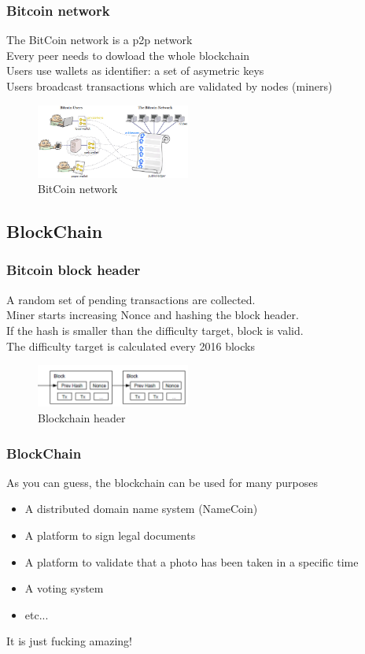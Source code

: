 \documentclass[usepdftitle=false,13pt]{beamer}
\begin{document}
\begin{frame}\frametitle{Bitcoin network}
The BitCoin network is a p2p network\\
Every peer needs to dowload the whole blockchain\\
Users use wallets as identifier: a set of asymetric keys\\
Users broadcast transactions which are validated by nodes (miners)\\
\begin{figure}[h!]
\begin{center}
\includegraphics[width=0.45\textwidth]{pic/bitcoin-network}
\caption{BitCoin network}
\label{fig:block}
\end{center}
\end{figure}
\end{frame}

\subsection{BlockChain}

\begin{frame}\frametitle{Bitcoin block header}
A random set of pending transactions are collected.\\
Miner starts increasing Nonce and hashing the block header.\\
If the hash is smaller than the difficulty target, block is valid.\\
The difficulty target is calculated every 2016 blocks\\
\begin{figure}[h!]
\begin{center}
\includegraphics[width=0.45\textwidth]{pic/block}
\caption{Blockchain header}
\label{fig:block}
\end{center}
\end{figure}
\end{frame}

\begin{frame}\frametitle{BlockChain}
	As you can guess, the blockchain can be used for many purposes
	\begin{itemize}
		\item A distributed domain name system (NameCoin)
		\item A platform to sign legal documents
		\item A platform to validate that a photo has been taken in a specific time
		\item A voting system
		\item etc...
	\end{itemize}
	It is just fucking amazing!
\end{frame}
\end{document}
